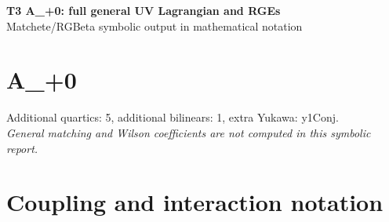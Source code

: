 \documentclass[10pt,a4paper]{article}
\begin{document}
\begin{center}
{\Large\bfseries T3 A\_+0: full general UV Lagrangian and RGEs}\\[4pt]
Matchete/RGBeta symbolic output in mathematical notation
\end{center}
\bigskip
\section*{A\_+0}
Additional quartics: 5, additional bilinears: 1, extra Yukawa: y1Conj.\\
\emph{General matching and Wilson coefficients are not computed in this symbolic report.}
\section*{Coupling and interaction notation}
\end{document}
